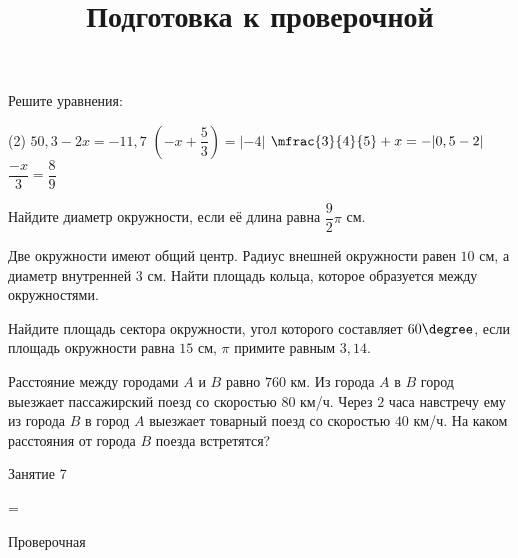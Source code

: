 \begin{homework}[number=3]
	\begin{listofex}
		\item Решите уравнения:
		\begin{tasks}(2)
			\task \( 50,3-2x=-11,7 \)
			\task \( \left( -x+\dfrac{ 5 }{ 3 } \right)=|-4| \)
			\task \( \mfrac{3 }{4 }{5 }+x=-|0,5-2| \)
			\task \( \dfrac{ -x }{ 3 }=\dfrac{ 8 }{ 9 } \)
		\end{tasks}
		\item Найдите диаметр окружности, если её длина равна \( \dfrac{ 9 }{ 2 }\pi \) см.
		\item Две окружности имеют общий центр. Радиус внешней окружности равен \(10\) см, а диаметр внутренней \(3\) см. Найти площадь кольца, которое образуется между окружностями.
		\item Найдите площадь сектора окружности, угол которого составляет \(60 \degree\), если площадь окружности равна \( 15 \) см, \(\pi\) примите равным \(3,14\).
		\item Расстояние между городами \(A\) и \(B\) равно \(760\) км. Из города \(A\) в \(B\) город выезжает пассажирский поезд со скоростью \(80\) км/ч. Через \(2\) часа навстречу ему из города \(B\) в город \(A\) выезжает товарный поезд со скоростью \(40\) км/ч. На каком расстояния от города \(B\) поезда встретятся?
	\end{listofex}
\end{homework}

\begin{class}[number=7]
	\title{Подготовка к проверочной}
	\begin{listofex}
		\item Занятие 7
	\end{listofex}
\end{class}

=%
\begin{exam}
	\begin{listofex}
		\item Проверочная
	\end{listofex}
\end{exam}

